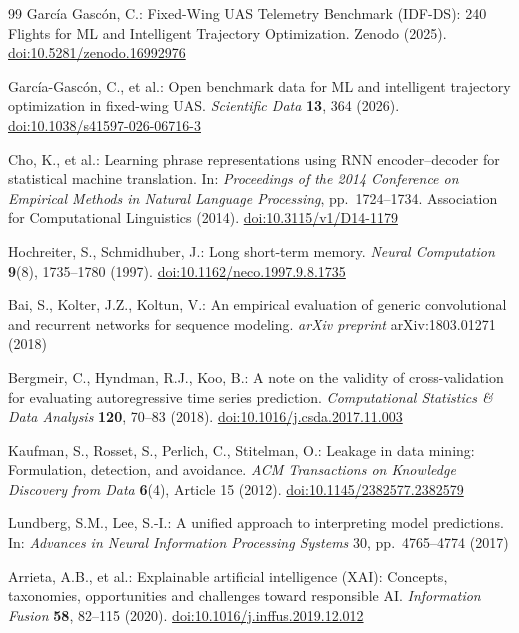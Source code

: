 \documentclass[runningheads,a4paper]{llncs}
\begin{document}
\begin{thebibliography}{99}
Garc\'ia Gasc\'on, C.: Fixed-Wing UAS Telemetry Benchmark (IDF-DS): 240 Flights for ML and Intelligent Trajectory Optimization. Zenodo (2025). \href{https://doi.org/10.5281/zenodo.16992976}{doi:10.5281/zenodo.16992976}

Garc\'ia-Gasc\'on, C., et al.: Open benchmark data for ML and intelligent trajectory optimization in fixed-wing UAS. \textit{Scientific Data} \textbf{13}, 364 (2026). \href{https://doi.org/10.1038/s41597-026-06716-3}{doi:10.1038/s41597-026-06716-3}

Cho, K., et al.: Learning phrase representations using RNN encoder--decoder for statistical machine translation. In: \textit{Proceedings of the 2014 Conference on Empirical Methods in Natural Language Processing}, pp.~1724--1734. Association for Computational Linguistics (2014). \href{https://doi.org/10.3115/v1/D14-1179}{doi:10.3115/v1/D14-1179}

Hochreiter, S., Schmidhuber, J.: Long short-term memory. \textit{Neural Computation} \textbf{9}(8), 1735--1780 (1997). \href{https://doi.org/10.1162/neco.1997.9.8.1735}{doi:10.1162/neco.1997.9.8.1735}

Bai, S., Kolter, J.Z., Koltun, V.: An empirical evaluation of generic convolutional and recurrent networks for sequence modeling. \textit{arXiv preprint} arXiv:1803.01271 (2018)

Bergmeir, C., Hyndman, R.J., Koo, B.: A note on the validity of cross-validation for evaluating autoregressive time series prediction. \textit{Computational Statistics \& Data Analysis} \textbf{120}, 70--83 (2018). \href{https://doi.org/10.1016/j.csda.2017.11.003}{doi:10.1016/j.csda.2017.11.003}

Kaufman, S., Rosset, S., Perlich, C., Stitelman, O.: Leakage in data mining: Formulation, detection, and avoidance. \textit{ACM Transactions on Knowledge Discovery from Data} \textbf{6}(4), Article 15 (2012). \href{https://doi.org/10.1145/2382577.2382579}{doi:10.1145/2382577.2382579}

Lundberg, S.M., Lee, S.-I.: A unified approach to interpreting model predictions. In: \textit{Advances in Neural Information Processing Systems} 30, pp.~4765--4774 (2017)

Arrieta, A.B., et al.: Explainable artificial intelligence (XAI): Concepts, taxonomies, opportunities and challenges toward responsible AI. \textit{Information Fusion} \textbf{58}, 82--115 (2020). \href{https://doi.org/10.1016/j.inffus.2019.12.012}{doi:10.1016/j.inffus.2019.12.012}


\end{thebibliography}
\end{document}

